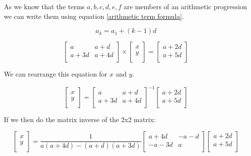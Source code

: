 \documentclass[12pt]{article}
\begin{document}
	As we know that the terms \(a, b, c, d, e, f\) are members of an arithmetic progression we can write them using equation \eqref{arithmetic term formula}.
	
	\begin{equation}\label{arithmetic term formula}
		a_k = a_1 + (k - 1)d
	\end{equation}

	\begin{equation*}
		\left [ \begin{array}{cc} 
			a & a + d \\
			a + 3d & a + 4d \\
		\end{array} \right ] \times
		\left [ \begin{array}{c}
			x \\
			y \\
		\end{array}\right ] = 
		\left [ \begin{array}{c}
			a + 2d \\
			a + 5d \\
		\end{array}\right ]
	\end{equation*}

	We can rearrange this equation for \(x\) and \(y\).
	
	
	\begin{equation*}
		\left [ \begin{array}{c}
			x \\
			y \\
		\end{array}\right ] = 
		\left [ \begin{array}{cc} 
			a & a + d \\
			a + 3d & a + 4d \\
		\end{array} \right ] ^{-1}
		\left [ \begin{array}{c}
			a + 2d \\
			a + 5d \\
		\end{array}\right ]
	\end{equation*}

	If we then do the matrix inverse of the 2x2 matrix:
	
	\begin{equation*}
		\left [ \begin{array}{c}
			x \\
			y \\
		\end{array}\right ] = 
		\frac{1}{a(a+4d) - (a+d)(a+3d)}
		\left [ \begin{array}{cc} 
			a + 4d & -a - d \\
			-a - 3d & a \\
		\end{array} \right ]
		\left [ \begin{array}{c}
			a + 2d \\
			a + 5d \\
		\end{array}\right ]
	\end{equation*}
\end{document}
